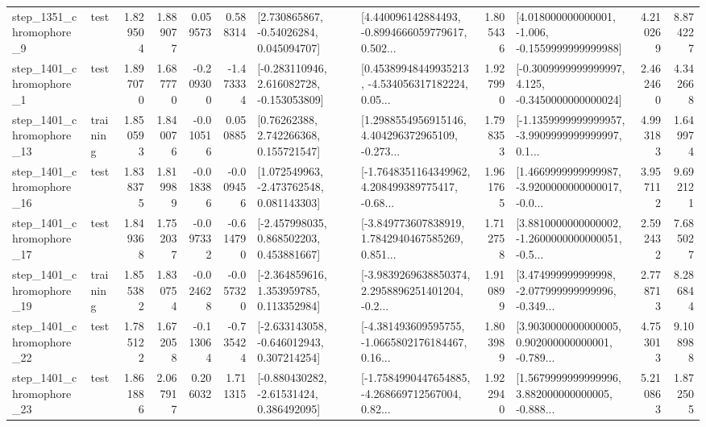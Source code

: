 \begin{tabular}{llrrrrllrlrr}
  step\_1351\_chromophore\_9 &      test &      1.829504 &    1.889077 &      0.059573 &  0.588314 &     [2.730865867, -0.54026284, 0.045094707] &  [4.440096142884493, -0.8994666059779617, 0.502... &       1.805436 &   [4.018000000000001, -1.006, -0.1559999999999988] &            4.210269 &          8.874227 \\
  step\_1401\_chromophore\_1 &      test &      1.897070 &    1.687770 &     -0.209300 & -1.473334 &   [-0.283110946, 2.616082728, -0.153053809] &  [0.45389948449935213, -4.534056317182224, 0.05... &       1.927990 &  [-0.3009999999999997, 4.125, -0.3450000000000024] &            2.462460 &          4.342668 \\
 step\_1401\_chromophore\_13 &  training &      1.850593 &    1.840076 &     -0.010516 &  0.050885 &      [0.76262388, 2.742266368, 0.155721547] &  [1.2988554956915146, 4.404296372965109, -0.273... &       1.798353 &  [-1.1359999999999957, -3.9909999999999997, 0.1... &            4.993183 &          1.649974 \\
 step\_1401\_chromophore\_16 &      test &      1.838375 &    1.819989 &     -0.018386 & -0.009456 &    [1.072549963, -2.473762548, 0.081143303] &  [-1.7648351164349962, 4.208499389775417, -0.68... &       1.961765 &  [1.4669999999999987, -3.9200000000000017, -0.0... &            3.957112 &          9.692121 \\
 step\_1401\_chromophore\_17 &      test &      1.849368 &    1.752037 &     -0.097332 & -0.614790 &    [-2.457998035, 0.868502203, 0.453881667] &  [-3.849773607838919, 1.7842940467585269, 0.851... &       1.712758 &  [3.8810000000000002, -1.2600000000000051, -0.5... &            2.592432 &          7.685027 \\
 step\_1401\_chromophore\_19 &  training &      1.855382 &    1.830754 &     -0.024628 & -0.057320 &    [-2.364859616, 1.353959785, 0.113352984] &  [-3.9839269638850374, 2.2958896251401204, -0.2... &       1.910899 &  [3.474999999999998, -2.077999999999996, -0.349... &            2.778713 &          8.286844 \\
 step\_1401\_chromophore\_22 &      test &      1.785122 &    1.672058 &     -0.113064 & -0.735424 &   [-2.633143058, -0.646012943, 0.307214254] &  [-4.381493609595755, -1.0665802176184467, 0.16... &       1.803989 &  [3.9030000000000005, 0.902000000000001, -0.789... &            4.753013 &          9.108988 \\
 step\_1401\_chromophore\_23 &      test &      1.861886 &    2.067917 &      0.206032 &  1.711315 &    [-0.880430282, -2.61531424, 0.386492095] &  [-1.7584990447654885, -4.268669712567004, 0.82... &       1.922940 &  [1.5679999999999996, 3.882000000000005, -0.888... &            5.210863 &          1.872505 \\

\end{tabular}
